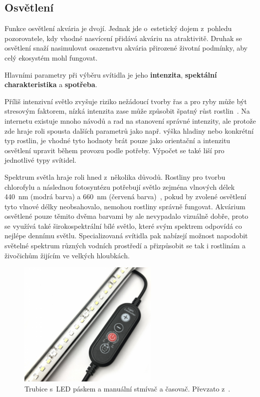     \subsection{Osvětlení}
        Funkce osvětlení akvária je dvojí. Jednak jde o~estetický dojem z~pohledu pozorovatele, kdy vhodné nasvícení přidává akváriu na atraktivitě. Druhak se osvětlení snaží nasimulovat osazenstvu akvária přirozené životní podmínky, aby celý ekosystém mohl fungovat.

        Hlavními parametry při výběru svítidla je jeho \textbf{intenzita}, \textbf{spektální charakteristika} a \textbf{spotřeba}. 
        
        Příliš intenzivní světlo zvyšuje riziko nežádoucí tvorby řas a pro ryby může být stresovým faktorem, nízká intenzita zase může způsobit špatný růst rostlin~\cite{KejzlarRadim2022Ařpa}. Na internetu existuje mnoho návodů a rad na stanovení správné intenzity, ale protože zde hraje roli spousta dalších parametrů jako např. výška hladiny nebo konkrétní typ rostlin, je vhodné tyto hodnoty brát pouze jako orientační a intenzitu osvětlení upravit během provozu podle potřeby. Výpočet se také liší pro jednotlivé typy svítidel. 

        Spektrum světla hraje roli hned z~několika důvodů. Rostliny pro tvorbu chlorofylu a následnou fotosyntézu potřebují světlo zejména vlnových délek \qty{440}{nm} (modrá barva) a \qty{660}{nm} (červená barva)~\cite{eshop-ledsolution-svetlo}, pokud by zvolené osvětlení tyto vlnové délky neobsahovalo, nemohou rostliny správně fungovat. Akvárium osvětlené pouze těmito dvěma barvami by ale nevypadalo vizuálně dobře, proto se využívá také širokospektrální bílé světlo, které svým spektrem odpovídá co nejlépe dennímu světlu. 
        Specializovaná svítidla pak nabízejí možnost napodobit světelné spektrum různých vodních prostředí a přizpůsobit se tak i rostlinám a živočichům žijícím ve velkých hloubkách. 

 
        \begin{figure}[h!]
            \centering
            \includegraphics[width=0.6\textwidth]{obrazky/osvetleni/stmivac.jpg}
            \caption{Trubice s~LED páskem a manuální stmívač a časovač. Převzato z~\cite{eshop-rostlinna-akvaria}.}
            \label{fig:obrazky-osvetleni-stmivac-jpg}
        \end{figure}

